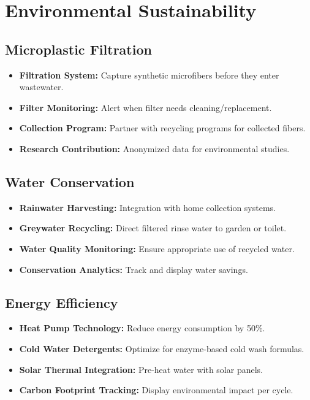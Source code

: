 \section{Environmental Sustainability}

\subsection{Microplastic Filtration}
\begin{itemize}
    \item \textbf{Filtration System:} Capture synthetic microfibers before they enter wastewater.
    \item \textbf{Filter Monitoring:} Alert when filter needs cleaning/replacement.
    \item \textbf{Collection Program:} Partner with recycling programs for collected fibers.
    \item \textbf{Research Contribution:} Anonymized data for environmental studies.
\end{itemize}

\subsection{Water Conservation}
\begin{itemize}
    \item \textbf{Rainwater Harvesting:} Integration with home collection systems.
    \item \textbf{Greywater Recycling:} Direct filtered rinse water to garden or toilet.
    \item \textbf{Water Quality Monitoring:} Ensure appropriate use of recycled water.
    \item \textbf{Conservation Analytics:} Track and display water savings.
\end{itemize}

\subsection{Energy Efficiency}
\begin{itemize}
    \item \textbf{Heat Pump Technology:} Reduce energy consumption by 50\%.
    \item \textbf{Cold Water Detergents:} Optimize for enzyme-based cold wash formulas.
    \item \textbf{Solar Thermal Integration:} Pre-heat water with solar panels.
    \item \textbf{Carbon Footprint Tracking:} Display environmental impact per cycle.
\end{itemize}

